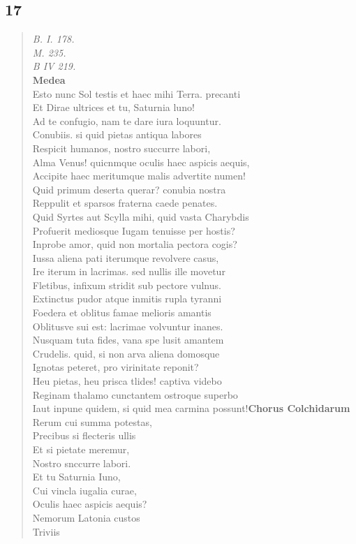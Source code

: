 \documentclass[11pt, a4paper]{report}
\begin{document}
            \subsection*{17}
      \begin{verse}
      \textit{B. I. 178.} \\ \textit{M. 235.} \\ \textit{B IV 219.} \\ \textbf{Medea} \\Esto nunc Sol testis et haec mihi Terra. precanti \\ Et Dirae ultrices et tu, Saturnia luno! \\ Ad te confugio, nam te dare iura loquuntur. \\ Conubiis. si quid pietas antiqua labores \\ Respicit humanos, nostro succurre labori, \\ Alma Venus! quicnmque oculis haec aspicis aequis, \\ Accipite haec meritumque malis advertite numen! \\ Quid primum deserta querar? conubia nostra \\ Reppulit et sparsos fraterna caede penates. \\ Quid Syrtes aut Scylla mihi, quid vasta Charybdis \\ Profuerit mediosque Iugam tenuisse per hostis? \\ Inprobe amor, quid non mortalia  \lbrack pectora \rbrack  cogis? \\ Iussa aliena pati iterumque revolvere casus, \\ Ire iterum in lacrimas. sed nullis ille movetur \\ Fletibus, infixum stridit sub pectore vulnus. \\ Extinctus pudor atque inmitis rupla tyranni \\ Foedera et oblitus famae melioris amantis \\ Oblitusve sui est: lacrimae volvuntur inanes. \\ Nusquam tuta fides, vana spe lusit amantem \\ Crudelis. quid, si non arva aliena domosque \\ Ignotas peteret, pro virinitate reponit? \\ Heu pietas, heu prisca tlides! captiva videbo \\ Reginam thalamo cunctantem ostroque superbo \\ Iaut inpune quidem, si quid mea carmina possunt!\textbf{Chorus Colchidarum} \\Rerum cui summa potestas, \\ Precibus si flecteris ullis \\ Et si pietate meremur, \\ Nostro snccurre labori. \\ Et tu Saturnia Iuno, \\ Cui vincla iugalia curae, \\ Oculis haec aspicis aequis? \\ Nemorum Latonia custos \\ Triviis 
\end{verse}
\end{document}

